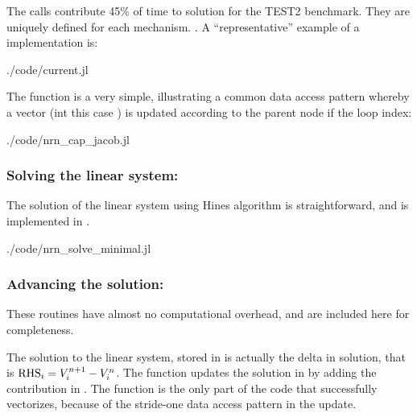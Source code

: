 The  calls contribute 45\% of time to solution for the TEST2 benchmark. They are uniquely defined for each mechanism. . A ``representative'' example of a  implementation is:
\begin{shaded}
 {./code/current.jl}
\end{shaded}

The  function is a very simple, illustrating a common data access pattern whereby a vector (int this case ) is updated according to the parent node if the loop index:
\begin{shaded}
 {./code/nrn_cap_jacob.jl}
\end{shaded}

\subsubsection{Solving the linear system: }
The solution of the linear system using Hines algorithm is straightforward, and is implemented in .

\begin{shaded}
 {./code/nrn_solve_minimal.jl}
\end{shaded}

\subsubsection{Advancing the solution: }

These routines have almost no computational overhead, and are included here for completeness.

The solution to the linear system, stored in  is actually the delta in solution, that is ${\text{RHS}}_{i} = {V}_{i}^{n+1} - {V}_{i}^{n}$. The  function updates the solution in  by adding the contribution in . The  function is the only part of the \neuron code that successfully vectorizes, because of the stride-one data access pattern in the update.

